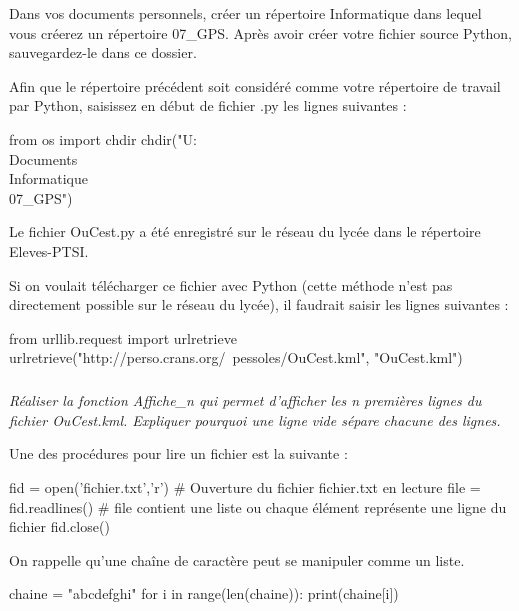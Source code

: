 \documentclass[10pt,oneside]{article}
\begin{document}
\begin{py}
Dans vos documents personnels, créer un répertoire \textsf{Informatique} dans lequel vous créerez un répertoire \textsf{07\_GPS}. Après avoir créer votre fichier source Python, sauvegardez-le dans ce dossier. 

Afin que le répertoire précédent soit considéré comme votre répertoire de travail par Python, saisissez en début de fichier .py les lignes suivantes :

\begin{python}
from os import chdir
chdir("U:\\Documents\\Informatique\\07_GPS")
\end{python}

 Le fichier \textsf{OuCest.py} a été enregistré sur le réseau du lycée dans le répertoire Eleves-PTSI. 

Si on voulait télécharger ce fichier avec Python (cette méthode n'est pas directement possible sur le réseau du lycée), il faudrait saisir les lignes suivantes :

\begin{python}
from urllib.request import urlretrieve
urlretrieve("http://perso.crans.org/~pessoles/OuCest.kml", "OuCest.kml")
\end{python}


\end{py}



\subparagraph{}
\textit{Réaliser la fonction \textsf{Affiche\_n} qui permet d'afficher les n premières lignes du fichier \textsf{OuCest.kml}. Expliquer pourquoi une ligne vide sépare chacune des lignes.}

\begin{py}
Une des procédures pour lire un fichier est la suivante :
\begin{python}
fid = open('fichier.txt','r') # Ouverture du fichier fichier.txt en lecture
file = fid.readlines()        # file contient une liste ou chaque élément représente une ligne du fichier
fid.close()
\end{python}

On rappelle qu'une chaîne de caractère peut se manipuler comme un liste. 
\begin{python}
chaine = "abcdefghi"
for i in range(len(chaine)):
    print(chaine[i])
\end{python}

\end{py}
\end{document}
